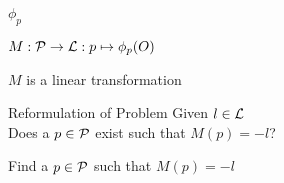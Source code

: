 \begin{frame}{$\phi_{p}$}
	\begin{definition}
		$M : \mathcal{P} \rightarrow \mathcal{L} : p \mapsto \phi_{p}(O)$
	\end{definition}
	
	\pause
	
	\begin{theorem}
		$M$ is a linear transformation
	\end{theorem}
\end{frame}

\begin{frame}{Reformulation of Problem}
	Given $l \in \mathcal{L}$\\
	Does a $p \in \mathcal{P}$ exist such that $M(p) = -l$?
	
	\pause
	
	Find a $p \in \mathcal{P}$ such that $M(p) = -l$	
\end{frame}

